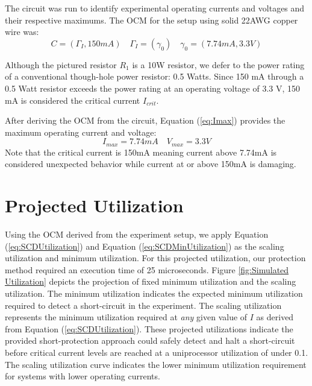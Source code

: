 \documentclass[11pt,compsoc,oneside]{report}
\begin{document}
The circuit was run to identify experimental operating currents and voltages and their respective maximums. The OCM for the setup using solid 22AWG copper wire was:
\begin{equation}\label{eq:OCMSetup}
C = (\Gamma_{I}, 150mA) \quad \Gamma_{I} = (\gamma_{0}) \quad \gamma_{0} = (7.74mA, 3.3V) \nonumber
\end{equation}

Although the pictured resistor $R_{1}$ is a 10W resistor, we defer to the power rating of a conventional though-hole power resistor: 0.5 Watts. Since 150 mA through a 0.5 Watt resistor exceeds the power rating at an operating voltage of 3.3 V, 150 mA is considered the critical current $I_{crit}$.

After deriving the OCM from the circuit, Equation (\ref{eq:Imax}) provides the maximum operating current and voltage:
\begin{equation}
I_{max} =  7.74mA \nonumber \quad V_{max} = 3.3V \nonumber
\end{equation}
Note that the critical current is 150mA meaning current above 7.74mA is considered unexpected behavior while current at or above 150mA is damaging.

\section{Projected Utilization}
Using the OCM derived from the experiment setup, we apply Equation (\ref{eq:SCDUtilization}) and Equation (\ref{eq:SCDMinUtilization}) as the scaling utilization and minimum utilization. For this projected utilization, our protection method required an execution time of 25 microseconds. Figure \ref{fig:Simulated Utilization} depicts the projection of fixed minimum utilization and the scaling utilization. The minimum utilization indicates the expected minimum utilization required to detect a short-circuit in the experiment. The scaling utilization represents the minimum utilization required at \textit{any} given value of $I$ as derived from Equation (\ref{eq:SCDUtilization}). These projected utilizations indicate the provided short-protection approach could safely detect and halt a short-circuit before critical current levels are reached at a uniprocessor utilization of under 0.1. The scaling utilization curve indicates the lower minimum utilization requirement for systems with lower operating currents.
\end{document}
